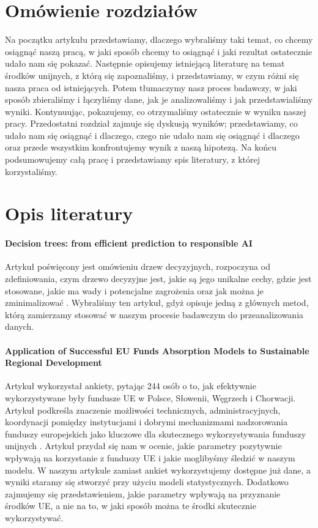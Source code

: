 \documentclass[12pt]{article}
\begin{document}
\section{Omówienie rozdziałów}
Na początku artykułu przedstawiamy, dlaczego wybraliśmy taki temat, co chcemy osiągnąć naszą pracą, w jaki sposób chcemy to osiągnąć i jaki rezultat ostatecznie udało nam się pokazać. 
Następnie opisujemy istniejącą literaturę na temat środków unijnych, z którą się zapoznaliśmy, i przedstawiamy, w czym różni się nasza praca od istniejących. 
Potem tłumaczymy nasz proces badawczy, w jaki sposób zbieraliśmy i łączyliśmy dane, jak je analizowaliśmy i jak przedstawialiśmy wyniki. 
Kontynuując, pokazujemy, co otrzymaliśmy ostatecznie w wyniku naszej pracy. 
Przedostatni rozdział zajmuje się dyskusją wyników; przedstawiamy, co udało nam się osiągnąć i dlaczego, czego nie udało nam się osiągnąć i dlaczego oraz przede wszystkim konfrontujemy wynik z naszą hipotezą. 
Na końcu podsumowujemy całą pracę i przedstawiamy spis literatury, z której korzystaliśmy.

\section{Opis literatury}
\paragraph{Decision trees: from efficient prediction to responsible AI}
Artykuł poświęcony jest omówieniu drzew decyzyjnych, rozpoczyna od zdefiniowania, czym drzewo decyzyjne jest, jakie są jego unikalne cechy, gdzie jest stosowane, jakie ma wady i potencjalne zagrożenia oraz jak można je zminimalizować \cite{4}. 
Wybraliśmy ten artykuł, gdyż opisuje jedną z głównych metod, którą zamierzamy stosować w naszym procesie badawczym do przeanalizowania danych.
\paragraph{Application of Successful EU Funds Absorption Models to Sustainable Regional Development}
Artykuł wykorzystał ankiety, pytając 244 osób o to, jak efektywnie wykorzystywane były fundusze UE w Polsce, Słowenii, Węgrzech i Chorwacji. Artykuł podkreśla znaczenie możliwości technicznych, administracyjnych, koordynacji pomiędzy instytucjami i dobrymi mechanizmami nadzorowania funduszy europejskich jako kluczowe dla skutecznego wykorzystywania funduszy unijnych \cite{5}. 
Artykuł przydał się nam w ocenie, jakie parametry pozytywnie wpływają na korzystanie z funduszy UE i jakie moglibyśmy śledzić w naszym modelu. W naszym artykule zamiast ankiet wykorzystujemy dostępne już dane, a wyniki staramy się stworzyć przy użyciu modeli statystycznych. Dodatkowo zajmujemy się przedstawieniem, jakie parametry wpływają na przyznanie środków UE, a nie na to, w jaki sposób można te środki skutecznie wykorzystywać.
\end{document}
